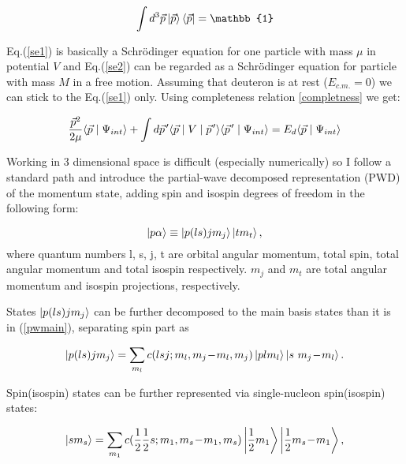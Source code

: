     \begin{equation}
        \int d^3\vec{p} \ket{\vec{p}} \bra{\vec{p}}   = \mathbb{1}
        \label{completness}
    \end{equation}

    Eq.(\ref{se1}) is basically a Schr\"{o}dinger equation for one particle with mass $\mu$
    in potential $V$ 
    and Eq.(\ref{se2}) can be regarded as a Schr\"{o}dinger equation for particle with mass $M$ in 
    a free motion. Assuming that deuteron is at rest ($E_{c.m.} = 0$) we can stick 
    to the Eq.(\ref{se1}) only. Using completeness relation \ref{completness} we get:

    \begin{equation}
        \frac{\vec{p}^2}{2\mu} \langle \vec{p} \mid \Psi_{int} \rangle +
        \int d \pvec{p} \langle \vec{p} \mid V \mid \pvec{p} \rangle
        \langle \pvec{p} \mid \Psi_{int} \rangle = 
        E_d \langle \vec{p} \mid \Psi_{int} \rangle
        \label{shrod_old}
    \end{equation}

    Working in 3 dimensional space  is difficult (especially numerically)
    so I follow a standard path and introduce the partial-wave decomposed representation (PWD) 
    of the momentum state, adding spin and isospin degrees of freedom in the following form:

    \begin{equation}
        \ket{p \alpha} \equiv \ket{p (ls) j m_j}  \ket{t m_t},
        \label{pwmain}
    \end{equation}
    where quantum numbers l, s, j, t are orbital angular momentum, total spin,
    total angular momentum and total isospin respectively. $m_j$ and $m_t$ are 
    total angular momentum and isospin projections, respectively.


    States $\ket{p (ls) j m_j}$ can be further decomposed to 
    the main basis states than it is in (\ref{pwmain}), separating spin part as 
    
    \begin{equation}
        \ket{p (ls) j m_j} = \sum_{m_l} c(lsj;m_l, m_j\!-\!m_l, m_j) \ket{p l m_l}
        \ket{s~m_j\!-\!m_l}.
        \label{full_decomp}
    \end{equation}

    Spin(isospin) states can be further represented via single-nucleon spin(isospin) states:

    \begin{equation}
        \ket{s m_s} = \sum_{m_1} c(\frac{1}{2}\frac{1}{2}s;m_1, m_s\!-\!m_1, m_s)
        \ket{\frac{1}{2} m_1}
        \ket{\frac{1}{2} m_s\!-\!m_1},
        \label{spin_decomp}
    \end{equation}

